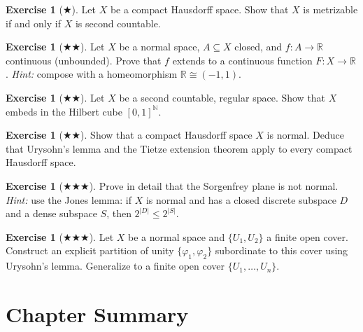 \documentclass[11pt,a4paper,twoside]{book}
\theoremstyle{remark}
\theoremstyle{definition}
\newtheorem{exerciseplain}[theorem]{Exercise}
\theoremstyle{definition}
\newenvironment{exercise}[1][]{%
  \begin{exerciseplain}[#1]
}{%
  \end{exerciseplain}
}
\begin{document}
\begin{exercise}[$\bigstar$]
\label{exo:urysohn-3}
Let $X$ be a compact Hausdorff space.  Show that $X$ is metrizable if
and only if $X$ is second countable.
\end{exercise}

\begin{exercise}[$\bigstar\bigstar$]
\label{exo:urysohn-4}
Let $X$ be a normal space, $A\subseteq X$ closed, and
$f\colon A\to\mathbb{R}$ continuous (unbounded).  Prove that $f$
extends to a continuous function $F\colon X\to\mathbb{R}$.
\textit{Hint:} compose with a homeomorphism $\mathbb{R}\cong(-1,1)$.
\end{exercise}

\begin{exercise}[$\bigstar\bigstar$]
\label{exo:urysohn-5}
Let $X$ be a second countable, regular space.  Show that $X$ embeds in
the Hilbert cube $[0,1]^{\mathbb{N}}$.
\end{exercise}

\begin{exercise}[$\bigstar\bigstar$]
\label{exo:urysohn-6}
Show that a compact Hausdorff space $X$ is normal.  Deduce that
Urysohn's lemma and the Tietze extension theorem apply to every
compact Hausdorff space.
\end{exercise}

\begin{exercise}[$\bigstar\bigstar\bigstar$]
\label{exo:urysohn-7}
Prove in detail that the Sorgenfrey plane is not normal.
\textit{Hint:} use the Jones lemma: if $X$ is normal and has a closed
discrete subspace $D$ and a dense subspace $S$, then
$2^{|D|}\le 2^{|S|}$.
\end{exercise}

\begin{exercise}[$\bigstar\bigstar\bigstar$]
\label{exo:urysohn-8}
Let $X$ be a normal space and $\{U_1,U_2\}$ a finite open cover.
Construct an explicit partition of unity $\{\varphi_1,\varphi_2\}$
subordinate to this cover using Urysohn's lemma.  Generalize to a
finite open cover $\{U_1,\ldots,U_n\}$.
\end{exercise}

\section*{Chapter Summary}
\end{document}
